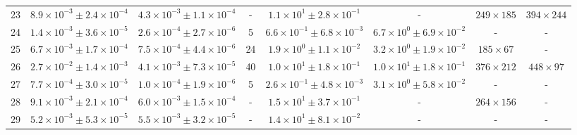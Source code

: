 \begin{table}
\begin{tabular}{cccccccc}
23 & $8.9\times10^{-3}\pm 2.4\times10^{-4}$ & $4.3\times10^{-3}\pm 1.1\times10^{-4}$ & - & $1.1\times10^{1}\pm 2.8\times10^{-1}$ & - & $249\times 185$ & $394\times 244$ \\
24 & $1.4\times10^{-3}\pm 3.6\times10^{-5}$ & $2.6\times10^{-4}\pm 2.7\times10^{-6}$ & 5 & $6.6\times10^{-1}\pm 6.8\times10^{-3}$ & $6.7\times10^{0}\pm 6.9\times10^{-2}$ & - & - \\
25 & $6.7\times10^{-3}\pm 1.7\times10^{-4}$ & $7.5\times10^{-4}\pm 4.4\times10^{-6}$ & 24 & $1.9\times10^{0}\pm 1.1\times10^{-2}$ & $3.2\times10^{0}\pm 1.9\times10^{-2}$ & $185\times 67$ & - \\
26 & $2.7\times10^{-2}\pm 1.4\times10^{-3}$ & $4.1\times10^{-3}\pm 7.3\times10^{-5}$ & 40 & $1.0\times10^{1}\pm 1.8\times10^{-1}$ & $1.0\times10^{1}\pm 1.8\times10^{-1}$ & $376\times 212$ & $448\times 97$ \\
27 & $7.7\times10^{-4}\pm 3.0\times10^{-5}$ & $1.0\times10^{-4}\pm 1.9\times10^{-6}$ & 5 & $2.6\times10^{-1}\pm 4.8\times10^{-3}$ & $3.1\times10^{0}\pm 5.8\times10^{-2}$ & - & - \\
28 & $9.1\times10^{-3}\pm 2.1\times10^{-4}$ & $6.0\times10^{-3}\pm 1.5\times10^{-4}$ & - & $1.5\times10^{1}\pm 3.7\times10^{-1}$ & - & $264\times 156$ & - \\
29 & $5.2\times10^{-3}\pm 5.3\times10^{-5}$ & $5.5\times10^{-3}\pm 3.2\times10^{-5}$ & - & $1.4\times10^{1}\pm 8.1\times10^{-2}$ & - & - & - \\
\end{tabular}
\end{table}
